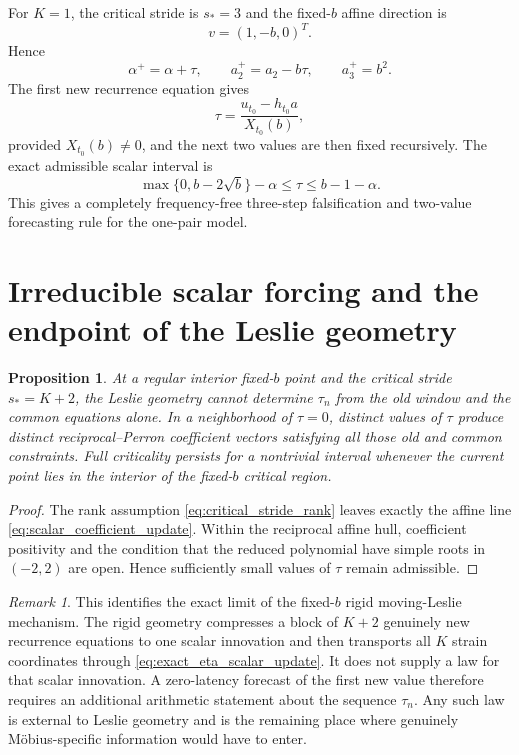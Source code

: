 \documentclass[11pt]{amsart}
\numberwithin{equation}{section}
\theoremstyle{plain}
\newtheorem{proposition}[theorem]{Proposition}
\theoremstyle{definition}
\theoremstyle{remark}
\newtheorem{remark}[theorem]{Remark}
\begin{document}
For $K=1$, the critical stride is $s_*=3$ and the fixed-$b$ affine direction is
\begin{equation}
v=(1,-b,0)^T.
\label{eq:K1_direction}
\end{equation}
Hence
\begin{equation}
\alpha^+=\alpha+\tau,
\qquad
a_2^+=a_2-b\tau,
\qquad
a_3^+=b^2.
\label{eq:K1_scalar_update}
\end{equation}
The first new recurrence equation gives
\begin{equation}
\tau
=
\frac{u_{t_0}-h_{t_0}a}{X_{t_0}(b)},
\label{eq:K1_tau}
\end{equation}
provided $X_{t_0}(b)\neq0$, and the next two values are then fixed recursively.  The exact admissible scalar interval is
\begin{equation}
\boxed{
\max\{0,b-2\sqrt b\}-\alpha
\leq\tau
\leq
b-1-\alpha.
}
\label{eq:K1_tau_interval}
\end{equation}
This gives a completely frequency-free three-step falsification and two-value forecasting rule for the one-pair model.

\section{Irreducible scalar forcing and the endpoint of the Leslie geometry}
\label{sec:irreducible_scalar_forcing}

\begin{proposition}
\label{prop:irreducible_scalar_forcing}
At a regular interior fixed-$b$ point and the critical stride $s_*=K+2$, the Leslie geometry cannot determine $\tau_n$ from the old window and the common equations alone.  In a neighborhood of $\tau=0$, distinct values of $\tau$ produce distinct reciprocal--Perron coefficient vectors satisfying all those old and common constraints.  Full criticality persists for a nontrivial interval whenever the current point lies in the interior of the fixed-$b$ critical region.
\end{proposition}

\begin{proof}
The rank assumption \eqref{eq:critical_stride_rank} leaves exactly the affine line \eqref{eq:scalar_coefficient_update}.  Within the reciprocal affine hull, coefficient positivity and the condition that the reduced polynomial have simple roots in $(-2,2)$ are open.  Hence sufficiently small values of $\tau$ remain admissible.
\end{proof}

\begin{remark}
\label{rem:true_remaining_problem}
This identifies the exact limit of the fixed-$b$ rigid moving-Leslie mechanism.  The rigid geometry compresses a block of $K+2$ genuinely new recurrence equations to one scalar innovation and then transports all $K$ strain coordinates through \eqref{eq:exact_eta_scalar_update}.  It does not supply a law for that scalar innovation.  A zero-latency forecast of the first new value therefore requires an additional arithmetic statement about the sequence $\tau_n$.  Any such law is external to Leslie geometry and is the remaining place where genuinely Möbius-specific information would have to enter.
\end{remark}
\end{document}
